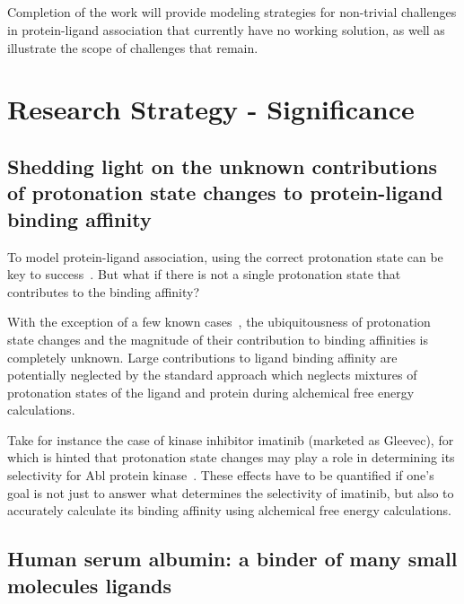 \documentclass[10pt,final]{article}
\newif\ifinstr
\newcommand{\instr}[1]{\ifdraft{\ifinstr {\color{cyan}\emph{#1}} \fi}{}}
\begin{document}
\subsection*{} %

Completion of the work will provide modeling strategies for non-trivial challenges in protein-ligand association that currently have no working solution, as well as illustrate the scope of challenges that remain.

\section*{Research Strategy - Significance}
\instr{General background, significance in terms of basic science and disease relevance.}


\subsection*{Shedding light on the unknown contributions of protonation state changes to protein-ligand binding affinity}
To model protein-ligand association, using the correct protonation state can be key to success~\cite{Polgar2005a,Wittayanarakul2008a}. But what if there is not a single protonation state that contributes to the binding affinity?

With the exception of a few known cases~\cite{Aleksandrov2007a,Czodrowski2007a,Steuber2007a,Czodrowski2007b}, the ubiquitousness of protonation state changes and the magnitude of their contribution to binding affinities is completely unknown. Large contributions to ligand binding affinity are potentially neglected by the standard approach which neglects mixtures of protonation states of the ligand and protein during alchemical free energy calculations.

Take for instance the case of kinase inhibitor imatinib (marketed as Gleevec), for which is hinted that protonation state changes may play a role in determining its selectivity for Abl protein kinase~\cite{Lin2013a}. These effects have to be quantified if one's goal is not just to answer what determines the selectivity of imatinib, but also to accurately calculate its binding affinity using alchemical free energy calculations.

\subsection*{Human serum albumin: a binder of many small molecules ligands}
\end{document}
